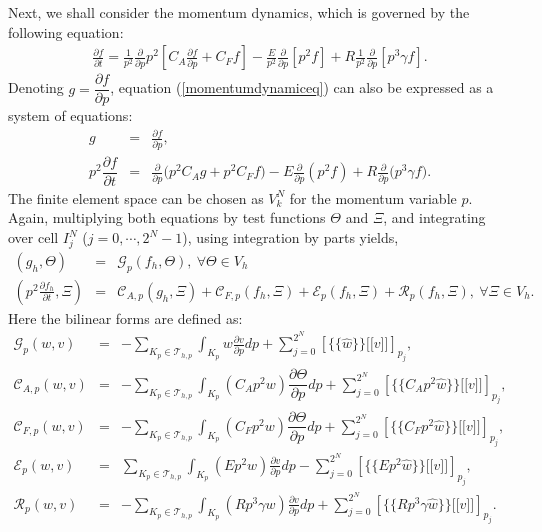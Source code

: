 \documentclass[preprint,11pt]{elsarticle}
\def\ljump{{[\![}}
\def\rjump{{]\!]}}
\def\lavg{{\{\!\{}}
\def\ravg{{\}\!\}}}
\begin{document}
Next, we shall consider the momentum dynamics, which is governed by the following equation: 
%
\begin{eqnarray}
\label{momentumdynamiceq}
    \frac{\partial f}{\partial t} = \frac{1}{p^2}\frac{\partial}{\partial p}p^2\left[C_A\frac{\partial f}{\partial p}+C_Ff\right]-\frac{E}{p^2}\frac{\partial}{\partial p}\left[p^2f\right]+R\frac{1}{p^2}\frac{\partial}{\partial p}\left[p^3\gamma f\right].\label{pitch_full_eq}
\end{eqnarray}
Denoting $g = \dfrac{\partial f}{\partial p}$, equation (\ref{momentumdynamiceq}) can also be expressed as a system of equations:
\begin{eqnarray}
g &=& \frac{\partial f}{\partial p},\label{numericalmomentumeq1}\\%
p^2\dfrac{\partial f}{\partial t} &=& \frac{\partial}{\partial p} \big(p^2C_A g+p^2C_Ff\big) -{E}\frac{\partial}{\partial p}(p^2f)+ R\frac{\partial}{\partial p} \big(p^3\gamma f\big).\label{numericalmomentumeq2}
\end{eqnarray}
The finite element space can be chosen as $V_k^N$ for the momentum variable $p$. Again, multiplying both equations by test functions $\Theta$ and $\Xi$, and integrating over cell $I_j^N$ ($j = 0,\cdots,2^N-1$), using integration by parts yields, 
\begin{eqnarray}
\label{numericalschememomentum1}
(g_h,\Theta) &=& \mathcal{G}_p(f_h,\Theta),\ \forall\Theta\in V_h\\
\label{numericalschememomentum2}
(p^2\frac{\partial f_h}{\partial t},\Xi)
&=&\mathcal{C}_{A,p}(g_h,\Xi) + \mathcal{C}_{F,p}(f_h,\Xi)+\mathcal{E}_{p}(f_h,\Xi)+\mathcal{R}_{p}(f_h,\Xi),\ \forall\Xi\in V_h.
\end{eqnarray}
Here the bilinear forms are defined as:
\begin{eqnarray}
\mathcal{G}_p(w,v) &=& -\sum_{K_p\in \mathcal{T}_{h,p}}\int_{K_p}w\frac{\partial v}{\partial p}dp+\sum_{j=0}^{2^N}\left[\lavg\widehat{w}\ravg\ljump v\rjump\right]_{p_j},\\
\mathcal{C}_{A,p}(w,v) &=& -\sum_{K_p\in \mathcal{T}_{h,p}}\int_{K_p}(C_Ap^2w)\dfrac{\partial\Theta}{\partial p}dp+\sum_{j=0}^{2^N}\left[\lavg C_Ap^2\hat{w}\ravg\ljump v\rjump\right]_{p_j},\\
\mathcal{C}_{F,p}(w,v) &=& -\sum_{K_p\in \mathcal{T}_{h,p}}\int_{K_p}(C_Fp^2w)\dfrac{\partial\Theta}{\partial p}dp+\sum_{j=0}^{2^N}\left[\lavg C_Fp^2\hat{w}\ravg\ljump v\rjump\right]_{p_j},\\
\mathcal{E}_p(w,v)&=&\sum_{K_p\in \mathcal{T}_{h,p}}\int_{K_p}(Ep^2w)\frac{\partial v}{\partial p}dp-\sum_{j=0}^{2^N}\left[\lavg Ep^2 \hat{w}\ravg\ljump v\rjump\right]_{p_j},\\
\mathcal{R}_{p}(w,v)&=& -\sum_{K_p\in \mathcal{T}_{h,p}}\int_{K_p}(Rp^3\gamma w)\frac{\partial v}{\partial p}dp+\sum_{j=0}^{2^N}\left[\lavg Rp^3\gamma\hat{w}\ravg\ljump v\rjump\right]_{p_j}.
\end{eqnarray}
\end{document}
